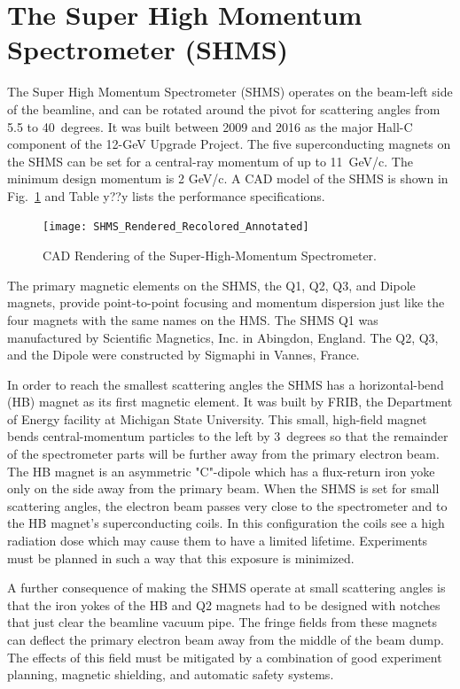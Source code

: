 {\section{The Super High Momentum Spectrometer (SHMS)}
%
The Super High Momentum Spectrometer (SHMS) operates on the beam-left
side of the beamline, and can be rotated around the pivot for scattering angles from 5.5
to 40~degrees. It was built between 2009 and 2016 as the major
Hall-C component of the 12-GeV Upgrade Project.  The five superconducting
magnets on the SHMS can be set for a central-ray momentum of up to 11~GeV/c.
The minimum design momentum is 2 GeV/c. A CAD model of the SHMS is shown
in Fig.~\ref{fig:SHMS_CAD_Model} and Table y??y lists the performance specifications. 

\begin{figure}
\texttt{[image: SHMS\_Rendered\_Recolored\_Annotated]}
\caption{CAD Rendering of the Super-High-Momentum Spectrometer. \label{fig:SHMS_CAD_Model}}
\end{figure}

The primary magnetic elements on the SHMS, the Q1, Q2, Q3, and Dipole magnets, provide
point-to-point focusing and momentum dispersion just like the four magnets with
the same names on the HMS. The SHMS Q1 was 
manufactured by Scientific Magnetics, Inc. in Abingdon, England. The Q2, Q3, and
the Dipole were constructed by Sigmaphi in Vannes, France.

In order to reach the smallest scattering angles the SHMS has a horizontal-bend
(HB) magnet as its first magnetic element. It was built by FRIB, the Department of Energy
facility at Michigan State  University. This small, high-field magnet bends
central-momentum particles to the left by 3~degrees so that the remainder of the
spectrometer parts will be further away from the primary electron beam. The HB
magnet is an asymmetric "C"-dipole which has a flux-return iron yoke only on
the side away from the primary beam. When the SHMS is set for small scattering 
angles, the electron beam passes very close to the spectrometer and to the
HB magnet's superconducting
coils. In this configuration the coils see a high radiation dose which may cause
them to have a limited 
lifetime. Experiments must be planned in such a way that this exposure is minimized.

A further consequence of making the SHMS operate at small scattering angles is
that the iron yokes of the HB and Q2 magnets had to be designed with notches 
that just clear the beamline vacuum pipe. The fringe fields from these magnets can
deflect the primary electron beam away from the middle of the beam dump. 
The effects of this field
must be mitigated by a combination of good experiment planning, magnetic shielding, 
and automatic safety systems.

}
